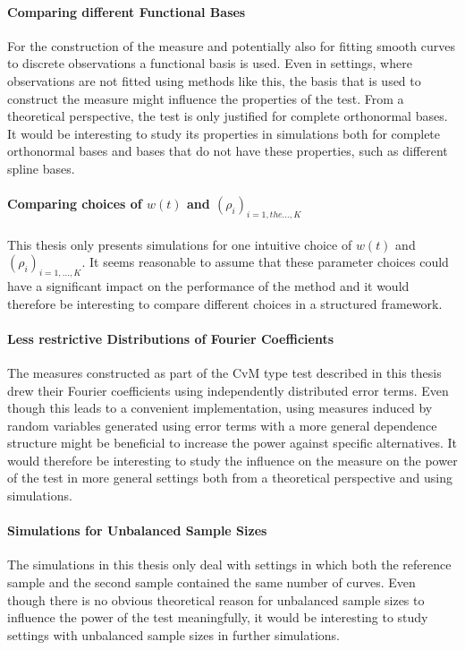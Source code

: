 \documentclass[12pt, a4paper]{article}
\theoremstyle{MAstyle} \newtheorem{assumption}{Assumption}[section]
\theoremstyle{MAstyle} \newtheorem{definition}{Definition}[section]
\theoremstyle{MAstyle} \newtheorem{theorem}{Theorem}[section]
\begin{document}
			\paragraph{Comparing different Functional Bases\\} 
			For the construction of the measure and potentially also for fitting smooth curves to discrete observations a functional basis is used. Even in settings, where observations are not fitted using methods like this, the basis that is used to construct the measure might influence the properties of the test. From a theoretical perspective, the test is only justified for complete orthonormal bases. It would be interesting to study its properties in simulations both for complete orthonormal bases and bases that do not have these properties, such as different spline bases.
		
			\paragraph{Comparing choices of $w(t)$ and  $\left(\rho_i\right)_{i = 1, the \dots, K}$\\}
			This thesis only presents simulations for one intuitive choice of $w(t)$ and $\left(\rho_i\right)_{i = 1, \dots, K}$. It seems reasonable to assume that these parameter choices could have a significant impact on the performance of the method and it would therefore be interesting to compare different choices in a structured framework.
			
			\paragraph{Less restrictive Distributions of Fourier Coefficients\\}
			The measures constructed as part of the CvM type test described in this thesis drew their Fourier coefficients using independently distributed error terms. Even though this leads to a convenient implementation, using measures induced by random variables generated using error terms with a more general dependence structure might be beneficial to increase the power against specific alternatives. It would therefore be interesting to study the influence on the measure on the power of the test in more general settings both from a theoretical perspective and using simulations. 
		
			\paragraph{Simulations for Unbalanced Sample Sizes\\}
			The simulations in this thesis only deal with settings in which both the reference sample and the second sample contained the same number of curves. Even though there is no obvious theoretical reason for unbalanced sample sizes to influence the power of the test meaningfully, it would be interesting to study settings with unbalanced sample sizes in further simulations.		
			
\end{document}
